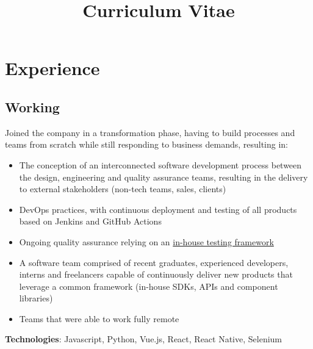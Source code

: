 \documentclass[11pt,a4paper]{moderncv}
\title{Curriculum Vitae}
\begin{document}
\maketitle

\vspace{-10mm}

\section{Experience}
\vspace{-2mm}
\subsection{Working}
{Joined the company in a transformation phase, having to build processes and teams from scratch while still responding to business demands, resulting in:
\begin{itemize}
  \item The conception of an interconnected software development process between the design, engineering and quality assurance teams, resulting in the delivery to external stakeholders (non-tech teams, sales, clients)
  \item DevOps practices, with continuous deployment and testing of all products based on Jenkins and GitHub Actions
  \item Ongoing quality assurance relying on an \href{https://github.com/ripe-tech/ripe-rainbow/}{in-house testing framework}
  \item A software team comprised of recent graduates, experienced developers, interns and freelancers capable of continuously deliver new products that leverage a common framework (in-house SDKs, APIs and component libraries)
  \item Teams that were able to work fully remote
\end{itemize}
\textbf{Technologies}: Javascript, Python, Vue.js, React, React Native, Selenium}
\end{document}
